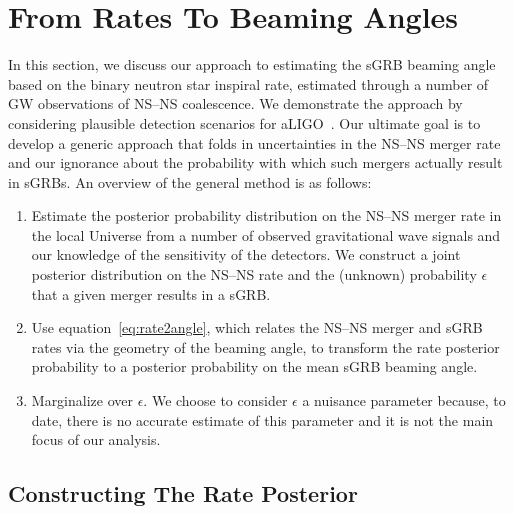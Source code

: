 \documentclass[twocolumn,nofootinbib]{revtex4-1}
\newcommand{\BNS}{\ac{NS}--\ac{NS}\xspace}
\begin{document}
\section{From Rates To Beaming Angles}

In this section, we discuss our approach to estimating the \ac{sGRB} beaming angle based on the binary neutron star inspiral rate, estimated through a number of \ac{GW} observations of \BNS coalescence.
We demonstrate the approach by considering plausible detection scenarios for \ac{aLIGO}~\cite{Aasi:2013wya}.
Our ultimate goal is to develop a generic approach that folds in uncertainties in the \BNS merger rate and our ignorance about the probability with which such mergers actually result in \acp{sGRB}.
%
An overview of the general method is as follows:

\begin{enumerate}
    \item Estimate the posterior probability distribution on the \BNS merger rate
    in the local Universe from a number of observed gravitational wave signals
    and our knowledge of the sensitivity of the detectors.  We construct a joint
    posterior distribution on the \BNS rate and the (unknown) probability
    $\epsilon$ that a given merger results in a \ac{sGRB}.
\item Use equation~\ref{eq:rate2angle}, which relates the \BNS merger and
    \ac{sGRB} rates via the geometry of the beaming angle, to transform the rate
    posterior probability to a posterior probability on the mean \ac{sGRB}
    beaming angle.
\item Marginalize over $\epsilon$. We choose to consider $\epsilon$ a nuisance
    parameter because, to date, there is no accurate estimate of this parameter
    and it is not the main focus of our analysis. 
\end{enumerate}


\subsection{Constructing The Rate Posterior}
\label{sec:rate_posterior}
%
\end{document}
